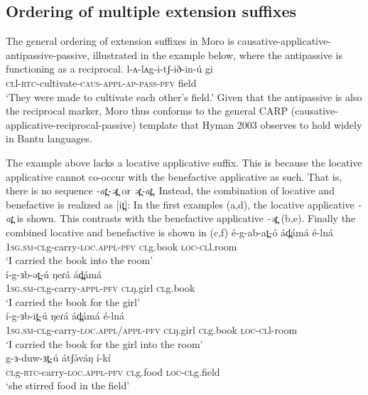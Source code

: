 \subsection{Ordering of multiple extension suffixes}\label{sec:ch11:extorder}

The general ordering of extension suffixes in Moro is causative-applicative-antipassive-passive, illustrated in the example below, where the antipassive is functioning as a reciprocal. 
\ea \gll l-ʌ-lʌg-i-tʃ-ið-in-ú gi\\
\textsc{cl}l-\textsc{rtc}-cultivate-\textsc{caus-appl-ap-pass-pfv} field \\
\glt `They were made to cultivate each other's field.'
\z 
Given that the antipassive is also the reciprocal marker, Moro thus conforms to the general CARP (causative-applicative-reciprocal-passive) template that Hyman 2003 observes to hold widely in Bantu languages.

The example above lacks a locative applicative suffix. This is because the locative applicative cannot co-occur with the benefactive applicative as such. That is, there is no sequence \textit{-at̪-ət̪} or \textit{ət̪-at̪}. Instead, the combination of locative and benefactive is realized as [it̪]: In the first examples (a,d), the locative applicative \textit{-at̪} is shown. This contrasts with the benefactive applicative \textit{-ət̪} (b,e). Finally the combined locative and benefactive is shown in (c,f)
\ea
\ea	\gll é-g-ab-at̪-ó 				ád̪ámá 		é-lná  \\
		1\textsc{sg.sm-cl}g-carry-\textsc{loc.appl-\textsc{pfv}}	\textsc{cl}g.book	\textsc{loc-cl}l.room\\
		\glt ‘I carried the book into the room’\\

\ex	\gll í-g-ɜb-ət̪-ú 			ŋeɾá 		ád̪ámá  \\
		1\textsc{sg.sm-cl}g-carry-\textsc{appl-\textsc{pfv}}	\textsc{cl}ŋ.girl		\textsc{cl}g.book	\\
	 	\glt ‘I carried the book for the girl’\\

\ex	\gll í-g-ɜb-it̪-ú 				ŋeɾá 		ád̪ámá 		é-lná  \\
	1\textsc{sg.sm-cl}g-carry-\textsc{loc.appl/appl-\textsc{pfv}}	\textsc{cl}ŋ.girl		\textsc{cl}g.book	\textsc{loc-cl}l-room\\
	\glt ‘I carried the book for the girl into the room’\\

\ex	\gll	g-ɜ-duw-ɜt̪-ú		átʃə́váŋ 		í-kí	\\
		\textsc{cl}g-\textsc{rtc}-carry-\textsc{loc.appl-\textsc{pfv}}	\textsc{cl}g.food	\textsc{loc-cl}g.field\\
		\glt ‘she stirred food in the field’\\

